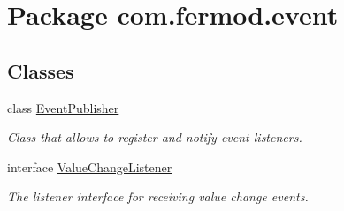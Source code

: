 \hypertarget{namespacecom_1_1fermod_1_1event}{}\section{Package com.\+fermod.\+event}
\label{namespacecom_1_1fermod_1_1event}
\subsection*{Classes}
\begin{DoxyCompactItemize}
\item 
class \mbox{\hyperlink{classcom_1_1fermod_1_1event_1_1EventPublisher}{Event\+Publisher}}
\begin{DoxyCompactList}\small\item\em Class that allows to register and notify event listeners. \end{DoxyCompactList}\item 
interface \mbox{\hyperlink{interfacecom_1_1fermod_1_1event_1_1ValueChangeListener}{Value\+Change\+Listener}}
\begin{DoxyCompactList}\small\item\em The listener interface for receiving value change events. \end{DoxyCompactList}\end{DoxyCompactItemize}
